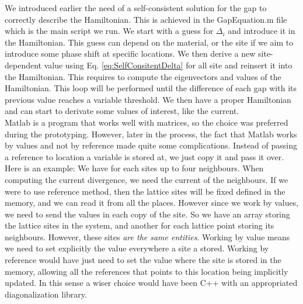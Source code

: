 \documentclass[../main.tex]{subfile}
\begin{document}
We introduced earlier the need of a self-consistent solution for the gap to correctly describe the Hamiltonian.
This is achieved in the GapEquation.m file which is the main script we run. We start with a guess for
$\Delta_i$ and introduce it in the Hamiltonian. This guess can depend on the material, or the site 
if we aim to introduce some phase shift at specific locations.
We then derive a new site-dependent value using Eq. \ref{eq:SelfConsitentDelta} for all site and
reinsert it into the Hamiltonian. This requires to compute the eigenvectors and values of the Hamiltonian. This loop will be 
performed until the difference of each gap with its previous value reaches a variable threshold. We then have a proper 
Hamiltonian and can start to derivate some values of interest, like the current.\\

Matlab is a program that works well with matrices, so the choice was preferred during the prototyping. However, later in the process, the fact that Matlab works 
by values and not by reference made quite some complications. Instead of passing a reference to location a variable is stored at,
we just copy it and pass it over. Here is an example: We have for each sites up to four neighbours. When computing the current divergence, 
we need the current of the neighbours. If we were to use reference method, then the lattice sites will be fixed defined in the memory,
and we can read it from all the places. However since we work by values, we need to send the values in each copy of the site.
So we have an array storing the lattice sites in the system, and another for each lattice point storing its neighbours.
However, these sites \textit{are the same entities}. Working by value means we need to set explicitly the value everywhere a site a stored.
Working by reference would have just need to set the value where the site is stored in the memory,
allowing all the references that points to this location being implicitly updated. In this sense a wiser choice would have been C++
with an appropriated diagonalization library. \\
\end{document}
